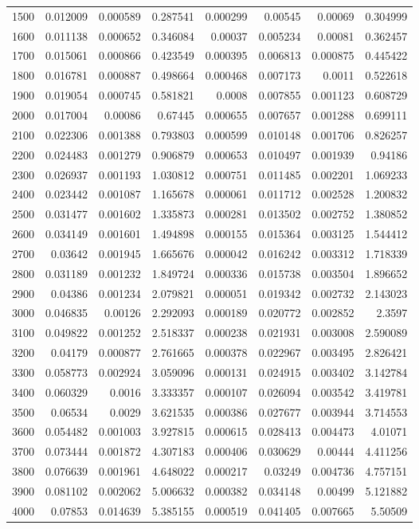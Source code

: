 \begin{tabular}{r r r r r r r r}
1500 & 0.012009 & 0.000589 & 0.287541 & 0.000299 & 0.00545 & 0.00069 & 0.304999 \\
1600 & 0.011138 & 0.000652 & 0.346084 & 0.00037 & 0.005234 & 0.00081 & 0.362457 \\
1700 & 0.015061 & 0.000866 & 0.423549 & 0.000395 & 0.006813 & 0.000875 & 0.445422 \\
1800 & 0.016781 & 0.000887 & 0.498664 & 0.000468 & 0.007173 & 0.0011 & 0.522618 \\
1900 & 0.019054 & 0.000745 & 0.581821 & 0.0008 & 0.007855 & 0.001123 & 0.608729 \\
2000 & 0.017004 & 0.00086 & 0.67445 & 0.000655 & 0.007657 & 0.001288 & 0.699111 \\
2100 & 0.022306 & 0.001388 & 0.793803 & 0.000599 & 0.010148 & 0.001706 & 0.826257 \\
2200 & 0.024483 & 0.001279 & 0.906879 & 0.000653 & 0.010497 & 0.001939 & 0.94186 \\
2300 & 0.026937 & 0.001193 & 1.030812 & 0.000751 & 0.011485 & 0.002201 & 1.069233 \\
2400 & 0.023442 & 0.001087 & 1.165678 & 0.000061 & 0.011712 & 0.002528 & 1.200832 \\
2500 & 0.031477 & 0.001602 & 1.335873 & 0.000281 & 0.013502 & 0.002752 & 1.380852 \\
2600 & 0.034149 & 0.001601 & 1.494898 & 0.000155 & 0.015364 & 0.003125 & 1.544412 \\
2700 & 0.03642 & 0.001945 & 1.665676 & 0.000042 & 0.016242 & 0.003312 & 1.718339 \\
2800 & 0.031189 & 0.001232 & 1.849724 & 0.000336 & 0.015738 & 0.003504 & 1.896652 \\
2900 & 0.04386 & 0.001234 & 2.079821 & 0.000051 & 0.019342 & 0.002732 & 2.143023 \\
3000 & 0.046835 & 0.00126 & 2.292093 & 0.000189 & 0.020772 & 0.002852 & 2.3597 \\
3100 & 0.049822 & 0.001252 & 2.518337 & 0.000238 & 0.021931 & 0.003008 & 2.590089 \\
3200 & 0.04179 & 0.000877 & 2.761665 & 0.000378 & 0.022967 & 0.003495 & 2.826421 \\
3300 & 0.058773 & 0.002924 & 3.059096 & 0.000131 & 0.024915 & 0.003402 & 3.142784 \\
3400 & 0.060329 & 0.0016 & 3.333357 & 0.000107 & 0.026094 & 0.003542 & 3.419781 \\
3500 & 0.06534 & 0.0029 & 3.621535 & 0.000386 & 0.027677 & 0.003944 & 3.714553 \\
3600 & 0.054482 & 0.001003 & 3.927815 & 0.000615 & 0.028413 & 0.004473 & 4.01071 \\
3700 & 0.073444 & 0.001872 & 4.307183 & 0.000406 & 0.030629 & 0.00444 & 4.411256 \\
3800 & 0.076639 & 0.001961 & 4.648022 & 0.000217 & 0.03249 & 0.004736 & 4.757151 \\
3900 & 0.081102 & 0.002062 & 5.006632 & 0.000382 & 0.034148 & 0.00499 & 5.121882 \\
4000 & 0.07853 & 0.014639 & 5.385155 & 0.000519 & 0.041405 & 0.007665 & 5.50509 \\
\end{tabular}

